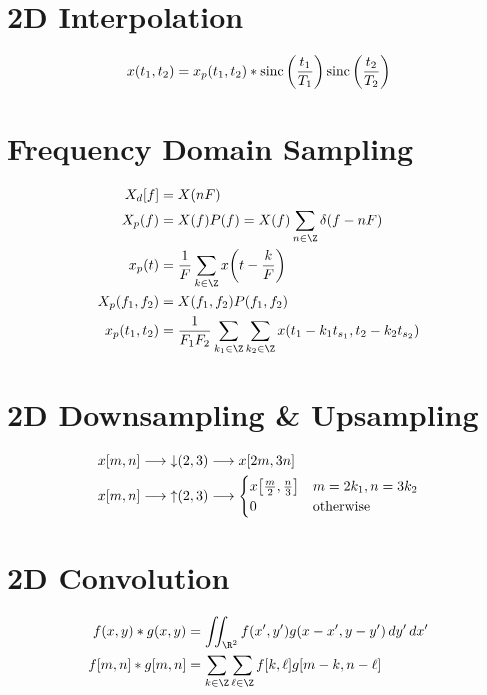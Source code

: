 \documentclass{article}
\DeclareMathOperator{\down}{\downarrow}
\DeclareMathOperator{\up}{\uparrow}
\DeclareMathOperator{\sinc}{sinc}
\begin{document}
\section{2D Interpolation}

\begin{equation}
    x(t_1, t_2) = x_p(t_1, t_2) \ast \sinc\qty(\frac{t_1}{T_1}) \sinc\qty(\frac{t_2}{T_2})
\end{equation}

\section{Frequency Domain Sampling}

\begin{align}
    X_d[f] &= X(nF) \\
    X_p(f) &= X(f) P(f) = X(f) \sum_{n \in \Z} \delta(f - nF) \\
    x_p(t) &= \frac{1}{F} \sum_{k \in \Z} x\qty(t - \frac{k}{F}) \\
    X_p(f_1, f_2) &= X(f_1, f_2) P(f_1, f_2) \\
    x_p(t_1, t_2) &= \frac{1}{F_1 F_2} \sum_{k_1 \in \Z} \sum_{k_2 \in \Z} x(t_1 - k_1 t_{s_1}, t_2 - k_2 t_{s_2})
\end{align}

\section{2D Downsampling \& Upsampling}

\begin{align}
    x[m, n] &\longrightarrow \down(2, 3) \longrightarrow x[2m, 3n] \\
    x[m, n] &\longrightarrow \up(2, 3) \longrightarrow
    \begin{cases}
        x\qty[\frac{m}{2}, \frac{n}{3}] & m = 2k_1, n = 3k_2 \\
        0 & \text{otherwise}
    \end{cases}
\end{align}

\section{2D Convolution}

\begin{align}
    f(x, y) \ast g(x, y) &= \iint_{\R^2} f(x', y') g(x - x', y - y') \, dy' \, dx' \\
    f[m, n] \ast g[m, n] &= \sum_{k \in \Z} \sum_{\ell \in \Z} f[k, \ell] g[m - k, n - \ell]
\end{align}
\end{document}
